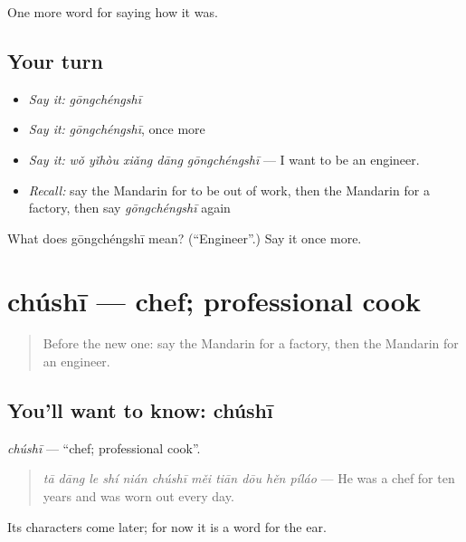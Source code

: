 \begin{grammarlens}[title={What you've built}]
One more word for saying how it was.
\end{grammarlens}

\subsection*{Your turn}
\begin{itemize}
\raggedright
  \item \emph{Say it:} \emph{gōngchéngshī}
  \item \emph{Say it:} \emph{gōngchéngshī}, once more
  \item \emph{Say it:} \emph{wǒ yǐhòu xiǎng dāng gōngchéngshī} — I want to be an engineer.
  \item \emph{Recall:} say the Mandarin for to be out of work, then the Mandarin for a factory, then say \emph{gōngchéngshī} again
\end{itemize}

\begin{tcolorbox}[breakable,colback=teal!4,colframe=teal!35!black,title={Before you move on}]
What does gōngchéngshī mean? (\textquotedblleft{}Engineer\textquotedblright{}.) Say it once more.
\end{tcolorbox}
\section[chúshī]{chúshī — chef; professional cook}

\label{lesson:ZH-C488-chushi}



\begin{quote}
Before the new one: say the Mandarin for a factory, then the Mandarin for an engineer.
\end{quote}

\subsection*{You'll want to know: chúshī}
\emph{chúshī} — \textquotedblleft{}chef; professional cook\textquotedblright{}.

\begin{quote}
\emph{tā dāng le shí nián chúshī měi tiān dōu hěn píláo} — He was a chef for ten years and was worn out every day.
\end{quote}

Its characters come later; for now it is a word for the ear.

